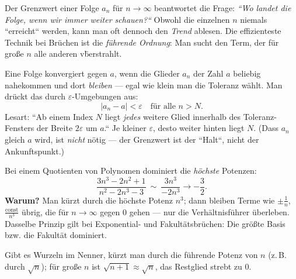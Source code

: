 


Der Grenzwert einer Folge $a_n$ f\"ur $n\to\infty$ beantwortet die Frage:
\emph{``Wo landet die Folge, wenn wir immer weiter schauen?``} Obwohl die
einzelnen $n$ niemals ``erreicht`` werden, kann man oft dennoch den
\emph{Trend} ablesen. Die effizienteste Technik bei Br\"uchen ist die
\emph{f\"uhrende Ordnung}: Man sucht den Term, der f\"ur gro\ss{}e $n$
alle anderen v\"berstrahlt.

\begin{werkzeugkasten}
Eine Folge konvergiert gegen $a$, wenn die Glieder $a_n$ der Zahl $a$
beliebig nahekommen und dort \emph{bleiben} --- egal wie klein man die
Toleranz w\"ahlt. Man dr\"uckt das durch $\varepsilon$-Umgebungen aus:
\begin{equation}
  |a_n-a|<\varepsilon \quad\text{f\"ur alle } n>N .
\end{equation}
Lesart: ``Ab einem Index $N$ liegt \emph{jedes} weitere Glied innerhalb
des Toleranz-Fensters der Breite $2\varepsilon$ um $a$.`` Je kleiner
$\varepsilon$, desto weiter hinten liegt $N$. (Dass $a_n$ gleich $a$
wird, ist \emph{nicht} n\"otig --- der Grenzwert ist der ``Halt``, nicht
der Ankunftspunkt.)
\end{werkzeugkasten}

\begin{werkzeugkasten}
Bei einem Quotienten von Polynomen dominiert die \emph{h\"ochste}
Potenzen:
\begin{equation}
  \frac{3n^3-2n^2+1}{n^2-2n^3-3}\ \sim\ \frac{3n^3}{-2n^3}
  \to -\frac32 .
\end{equation}
\textbf{Warum?} Man k\"urzt durch die h\"ochste Potenz $n^3$; dann bleiben
Terme wie $\pm\frac1n$, $\frac{\mathrm{const}}{n^3}$ \"ubrig, die f\"ur
$n\to\infty$ gegen $0$ gehen --- nur die Verh\"altnisf\"uhrer überleben.
Dasselbe Prinzip gilt bei Exponential- und Fakult\"atsbr\"uchen: Die
gr\"o\ss{}te Basis bzw. die Fakult\"at dominiert.
\end{werkzeugkasten}

\begin{werkzeugkasten}
Gibt es Wurzeln im Nenner, k\"urzt man durch die f\"uhrende Potenz von $n$
(z.\,B. durch $\sqrt n$); f\"ur gro\ss{}e $n$ ist $\sqrt{n+1}\approx
\sqrt n$, das Restglied strebt zu $0$.
\end{werkzeugkasten}

